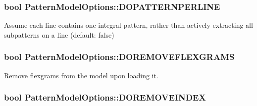 \hypertarget{classPatternModelOptions_ad4391604983decec050de83f13cd6235}{}
\subsubsection[{D\+O\+P\+A\+T\+T\+E\+R\+N\+P\+E\+R\+L\+I\+N\+E}]{\setlength{\rightskip}{0pt plus 5cm}bool Pattern\+Model\+Options\+::\+D\+O\+P\+A\+T\+T\+E\+R\+N\+P\+E\+R\+L\+I\+N\+E}\label{classPatternModelOptions_ad4391604983decec050de83f13cd6235}


Assume each line contains one integral pattern, rather than actively extracting all subpatterns on a line (default\+: false) 

\hypertarget{classPatternModelOptions_a82fad4131fd2b0a41a81f65586ae9378}{}
\subsubsection[{D\+O\+R\+E\+M\+O\+V\+E\+F\+L\+E\+X\+G\+R\+A\+M\+S}]{\setlength{\rightskip}{0pt plus 5cm}bool Pattern\+Model\+Options\+::\+D\+O\+R\+E\+M\+O\+V\+E\+F\+L\+E\+X\+G\+R\+A\+M\+S}\label{classPatternModelOptions_a82fad4131fd2b0a41a81f65586ae9378}


Remove flexgrams from the model upon loading it. 

\hypertarget{classPatternModelOptions_ad7c8615dee16492c719bf455bb67e6a5}{}
\subsubsection[{D\+O\+R\+E\+M\+O\+V\+E\+I\+N\+D\+E\+X}]{\setlength{\rightskip}{0pt plus 5cm}bool Pattern\+Model\+Options\+::\+D\+O\+R\+E\+M\+O\+V\+E\+I\+N\+D\+E\+X}\label{classPatternModelOptions_ad7c8615dee16492c719bf455bb67e6a5}


